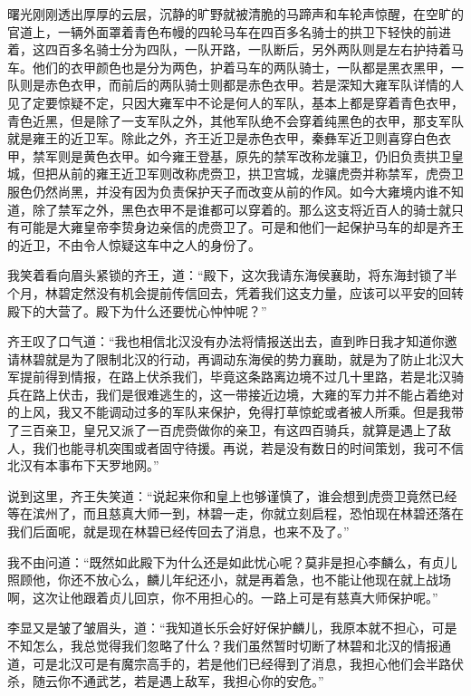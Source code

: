 曙光刚刚透出厚厚的云层，沉静的旷野就被清脆的马蹄声和车轮声惊醒，在空旷的官道上，一辆外面罩着青色布幔的四轮马车在四百多名骑士的拱卫下轻快的前进着，这四百多名骑士分为四队，一队开路，一队断后，另外两队则是左右护持着马车。他们的衣甲颜色也是分为两色，护着马车的两队骑士，一队都是黑衣黑甲，一队则是赤色衣甲，而前后的两队骑士则都是赤色衣甲。若是深知大雍军队详情的人见了定要惊疑不定，只因大雍军中不论是何人的军队，基本上都是穿着青色衣甲，青色近黑，但是除了一支军队之外，其他军队绝不会穿着纯黑色的衣甲，那支军队就是雍王的近卫军。除此之外，齐王近卫是赤色衣甲，秦彝军近卫则喜穿白色衣甲，禁军则是黄色衣甲。如今雍王登基，原先的禁军改称龙骧卫，仍旧负责拱卫皇城，但把从前的雍王近卫军则改称虎赍卫，拱卫宫城，龙骧虎赍并称禁军，虎赍卫服色仍然尚黑，并没有因为负责保护天子而改变从前的作风。如今大雍境内谁不知道，除了禁军之外，黑色衣甲不是谁都可以穿着的。那么这支将近百人的骑士就只有可能是大雍皇帝李贽身边亲信的虎赍卫了。可是和他们一起保护马车的却是齐王的近卫，不由令人惊疑这车中之人的身份了。

我笑着看向眉头紧锁的齐王，道：“殿下，这次我请东海侯襄助，将东海封锁了半个月，林碧定然没有机会提前传信回去，凭着我们这支力量，应该可以平安的回转殿下的大营了。殿下为什么还要忧心忡忡呢？”

齐王叹了口气道：“我也相信北汉没有办法将情报送出去，直到昨日我才知道你邀请林碧就是为了限制北汉的行动，再调动东海侯的势力襄助，就是为了防止北汉大军提前得到情报，在路上伏杀我们，毕竟这条路离边境不过几十里路，若是北汉骑兵在路上伏击，我们是很难逃生的，这一带接近边境，大雍的军力并不能占着绝对的上风，我又不能调动过多的军队来保护，免得打草惊蛇或者被人所乘。但是我带了三百亲卫，皇兄又派了一百虎赍做你的亲卫，有这四百骑兵，就算是遇上了敌人，我们也能寻机突围或者固守待援。再说，若是没有数日的时间策划，我可不信北汉有本事布下天罗地网。”

说到这里，齐王失笑道：“说起来你和皇上也够谨慎了，谁会想到虎赍卫竟然已经等在滨州了，而且慈真大师一到，林碧一走，你就立刻启程，恐怕现在林碧还落在我们后面呢，就是现在林碧已经传回去了消息，也来不及了。”

我不由问道：“既然如此殿下为什么还是如此忧心呢？莫非是担心李麟么，有贞儿照顾他，你还不放心么，麟儿年纪还小，就是再着急，也不能让他现在就上战场啊，这次让他跟着贞儿回京，你不用担心的。一路上可是有慈真大师保护呢。”

李显又是皱了皱眉头，道：“我知道长乐会好好保护麟儿，我原本就不担心，可是不知怎么，我总觉得我们忽略了什么？我们虽然暂时切断了林碧和北汉的情报通道，可是北汉可是有魔宗高手的，若是他们已经得到了消息，我担心他们会半路伏杀，随云你不通武艺，若是遇上敌军，我担心你的安危。”

